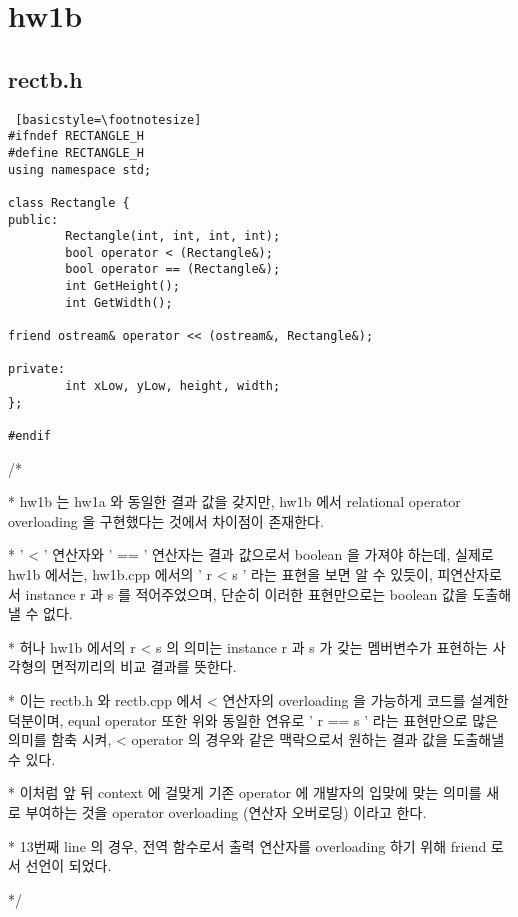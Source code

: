 \documentclass[twoside,twocolumn]{article}
\newenvironment{itemizeReduced}{
\begin{list}{\labelitemi}{\leftmargin=1em}
\setlength{\itemsep}{1pt}
\setlength{\parskip}{0pt}
\setlength{\parsep}{0pt}}{\end{list}
}
\begin{document}
\newpage

\section{hw1b}
\subsection{rectb.h}
\begin{lstlisting} [basicstyle=\footnotesize]
#ifndef RECTANGLE_H
#define RECTANGLE_H
using namespace std;

class Rectangle {
public:
        Rectangle(int, int, int, int);
        bool operator < (Rectangle&);
        bool operator == (Rectangle&);
        int GetHeight();
        int GetWidth();

friend ostream& operator << (ostream&, Rectangle&);

private:
        int xLow, yLow, height, width;
};

#endif
\end{lstlisting}
\begin{itemizeReduced}
    \item[/*] 
    \item[*] hw1b 는 hw1a 와 동일한 결과 값을 갖지만, hw1b 에서 relational operator overloading 을 구현했다는 것에서 차이점이 존재한다.
    \item[*] ' < ' 연산자와 ' == ' 연산자는 결과 값으로서 boolean 을 가져야 하는데, 실제로 hw1b 에서는, hw1b.cpp 에서의 ' r < s ' 라는 표현을 보면 알 수 있듯이, 피연산자로서 instance r 과 s 를 적어주었으며, 단순히 이러한 표현만으로는 boolean 값을 도출해낼 수 없다.
    \item[*] 허나 hw1b 에서의 r < s 의 의미는 instance r 과 s 가 갖는 멤버변수가 표현하는 사각형의 면적끼리의 비교 결과를 뜻한다.
    \item[*] 이는 rectb.h 와 rectb.cpp 에서 < 연산자의 overloading 을 가능하게 코드를 설계한 덕분이며, equal operator 또한 위와 동일한 연유로 ' r == s ' 라는 표현만으로 많은 의미를 함축 시켜, < operator 의 경우와 같은 맥락으로서 원하는 결과 값을 도출해낼 수 있다.
    \item[*] 이처럼 앞 뒤 context 에 걸맞게 기존 operator 에 개발자의 입맞에 맞는 의미를 새로 부여하는 것을 operator overloading (연산자 오버로딩) 이라고 한다.
    \item[*] 13번째 line 의 경우, 전역 함수로서 출력 연산자를 overloading 하기 위해 friend 로서 선언이 되었다.
\end{itemizeReduced}
*/
\end{document}
